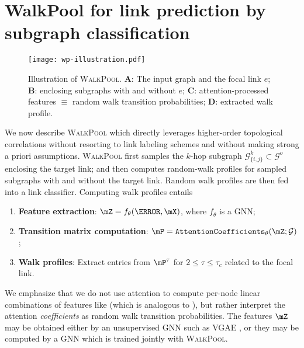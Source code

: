 \documentclass[11pt]{article}
\newcommand{\walkpool}{\textsc{WalkPool}\xspace}
\begin{document}
\section{WalkPool for link prediction by subgraph classification}
\vspace{-1mm}
\label{sec:walkpool}
\begin{figure}
\centering
\texttt{[image: wp-illustration.pdf]}
\caption{Illustration of \walkpool. \textbf{A}: The input graph and the focal link $e$; \textbf{B}: enclosing subgraphs with and without $e$; \textbf{C}: attention-processed features $\equiv$ random walk transition probabilities; \textbf{D}: extracted walk profile.}
\label{fig:wp-summary}
\vspace{-3mm}
\end{figure}

We now describe \walkpool which directly leverages higher-order topological correlations without resorting to link labeling schemes and without making strong a priori assumptions. \walkpool first samples the $k$-hop subgraph $\mathcal{G}_{\{i,j\}}^k \subset \mathcal{G}^o$ enclosing the target link; and then computes random-walk profiles for sampled subgraphs with and without the target link. Random walk profiles are then fed into a link classifier.
Computing walk profiles entails
\vspace{-1mm}
\begin{enumerate}
    \item \textbf{Feature extraction}: $\mZ = f_\theta(\mA, \mX)$, where $f_\theta$ is a GNN;
    \vspace{-1mm}
    \item \textbf{Transition matrix computation}: $\mP = \mathtt{AttentionCoefficients}_\theta(\mZ;\mathcal{G})$;
    \vspace{-1mm}
    \item \textbf{Walk profiles}: Extract entries from $\mP^\tau$ for $2 \leq \tau \leq \tau_c$ related to the focal link.
\end{enumerate}
\vspace{-1mm}
We emphasize that we do not use attention to compute per-node linear combinations of features like \cite{velivckovic2017graph} (which is analogous to \cite{vaswani2017attention}), but rather interpret the attention \emph{coefficients} as random walk transition probabilities. The features $\mZ$ may be obtained either by an unsupervised GNN such as VGAE \citep{kipf2016variational}, or they may be computed by a GNN which is trained jointly with \walkpool.
\end{document}
